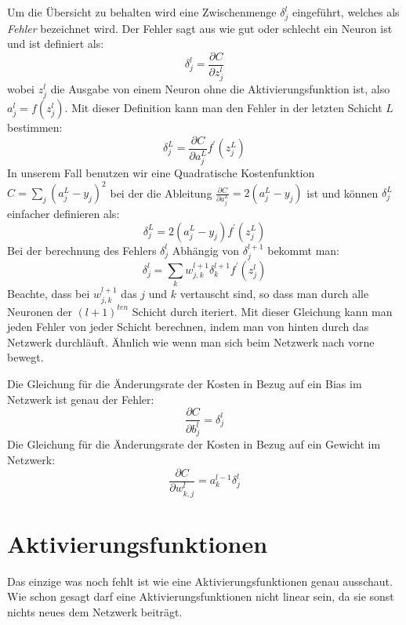 \documentclass[12pt,a4paper]{report}
\begin{document}
Um die Übersicht zu behalten wird eine Zwischenmenge $\delta^l_j$ eingeführt, welches als \textit{Fehler} bezeichnet wird.
Der Fehler sagt aus wie gut oder schlecht ein Neuron ist und ist definiert als:
\[\delta^l_j = \frac{\partial C}{\partial z^l_j}\]
wobei $z^l_j$ die Ausgabe von einem Neuron ohne die Aktivierungsfunktion ist, also $a^l_j = f(z^l_j)$.
Mit dieser Definition kann man den Fehler in der letzten Schicht $L$ bestimmen:
\[\delta^L_j = \frac{\partial C}{\partial a^L_j}f^\prime(z^L_j)\]
In unserem Fall benutzen wir eine Quadratische Kostenfunktion $C = \sum_{j}(a^L_j - y_j)^2$ bei
der die Ableitung $\frac{\partial C}{\partial a^L_j} = 2(a^L_j - y_j)$ ist und können $\delta^L_j$ einfacher definieren als:
\[\delta^L_j = 2(a^L_j - y_j)f^\prime(z^L_j)\]
Bei der berechnung des Fehlers $\delta^l_j$ Abhängig von $\delta^{l+1}_j$ bekommt man:
\[\delta^l_j = \sum_k w^{l+1}_{j,k}\delta^{l+1}_k f^\prime(z^l_j)\]
Beachte, dass bei $w^{l+1}_{j,k}$ das $j$ und $k$ vertauscht sind, so dass man durch alle Neuronen der $(l+1)^{ten}$ Schicht durch iteriert.
Mit dieser Gleichung kann man jeden Fehler von jeder Schicht berechnen, indem man von hinten durch das Netzwerk durchläuft.
Ähnlich wie wenn man sich beim Netzwerk nach vorne bewegt.

Die Gleichung für die Änderungsrate der Kosten in Bezug auf ein Bias im Netzwerk ist genau der Fehler:
\[\frac{\partial C}{\partial b^l_j} = \delta^l_j\]
Die Gleichung für die Änderungsrate der Kosten in Bezug auf ein Gewicht im Netzwerk:
\[\frac{\partial C}{\partial w^{l}_{k,j}} = a^{l-1}_k\delta^l_j\]

\section{Aktivierungsfunktionen}\label{sec:aktivierungsfunktionen}
Das einzige was noch fehlt ist wie eine Aktivierungsfunktionen genau ausschaut.
Wie schon gesagt darf eine Aktivierungsfunktionen nicht linear sein, da sie sonst nichts neues dem Netzwerk beiträgt.
\end{document}
